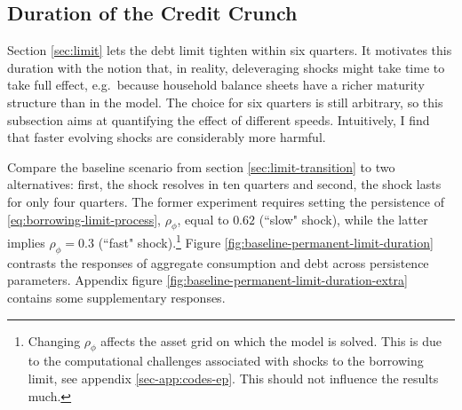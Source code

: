 \documentclass[a4paper,12pt]{article} %
\numberwithin{equation}{section} %
\numberwithin{figure}{section}
\numberwithin{table}{section}
\begin{document}
\subsection{Duration of the Credit Crunch}
\label{sec:sensitivity-persistence} 

Section \ref{sec:limit} lets the debt limit tighten within six quarters. It motivates this duration with the notion that, in reality, deleveraging shocks might take time to take full effect, e.g.~because household balance sheets have a richer maturity structure than in the model. The choice for six quarters is still arbitrary, so this subsection aims at quantifying the effect of different speeds. Intuitively, I find that faster evolving shocks are considerably more harmful.

Compare the baseline scenario from section \ref{sec:limit-transition} to two alternatives: first, the shock resolves in ten quarters and second, the shock lasts for only four quarters. The former experiment requires setting the persistence of \eqref{eq:borrowing-limit-process}, $\rho_{\phi}$, equal to $0.62$ (``slow" shock), while the latter implies $\rho_{\phi} = 0.3$ (``fast" shock).\footnote{Changing $\rho_{\phi}$ affects the asset grid on which the model is solved. This is due to the computational challenges associated with shocks to the borrowing limit, see appendix \ref{sec-app:codes-ep}. This should not influence the results much.} Figure \ref{fig:baseline-permanent-limit-duration} contrasts the responses of aggregate consumption and debt across persistence parameters. Appendix figure \ref{fig:baseline-permanent-limit-duration-extra} contains some supplementary responses.
\end{document}
